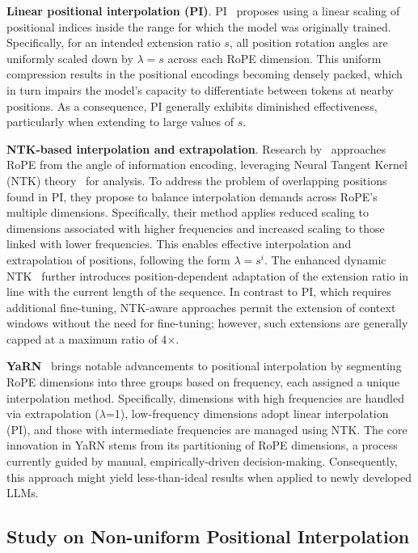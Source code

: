\textbf{Linear positional interpolation (PI)}. PI~\cite{pi} proposes using a linear scaling of positional indices inside the range for which the model was originally trained. Specifically, for an intended extension ratio $s$, all position rotation angles are uniformly scaled down by $\lambda = s$ across each RoPE dimension. This uniform compression results in the positional encodings becoming densely packed, which in turn impairs the model’s capacity to differentiate between tokens at nearby positions. As a consequence, PI generally exhibits diminished effectiveness, particularly when extending to large values of $s$.

\textbf{NTK-based interpolation and extrapolation}. Research by~\cite{ntk,dynamicntk} approaches RoPE from the angle of information encoding, leveraging Neural Tangent Kernel (NTK) theory~\cite{jacot2018neural,tancik2020fourier} for analysis. To address the problem of overlapping positions found in PI, they propose to balance interpolation demands across RoPE’s multiple dimensions. Specifically, their method applies reduced scaling to dimensions associated with higher frequencies and increased scaling to those linked with lower frequencies. This enables effective interpolation and extrapolation of positions, following the form $\lambda=s^{i}$. The enhanced dynamic NTK~\cite{dynamicntk} further introduces position-dependent adaptation of the extension ratio in line with the current length of the sequence. In contrast to PI, which requires additional fine-tuning, NTK-aware approaches permit the extension of context windows without the need for fine-tuning; however, such extensions are generally capped at a maximum ratio of 4$\times$.

\textbf{YaRN}~\cite{yarn} brings notable advancements to positional interpolation by segmenting RoPE dimensions into three groups based on frequency, each assigned a unique interpolation method. Specifically, dimensions with high frequencies are handled via extrapolation ($\lambda$=1), low-frequency dimensions adopt linear interpolation (PI), and those with intermediate frequencies are managed using NTK. The core innovation in YaRN stems from its partitioning of RoPE dimensions, a process currently guided by manual, empirically-driven decision-making. Consequently, this approach might yield less-than-ideal results when applied to newly developed LLMs.

\subsection{Study on Non-uniform Positional Interpolation}

